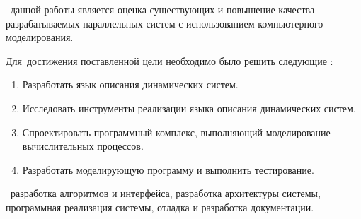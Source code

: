 
 \aim\ данной работы является оценка существующих и повышение качества разрабатываемых параллельных систем с использованием компьютерного моделирования.

Для~достижения поставленной цели необходимо было решить следующие {\tasks}:
\begin{enumerate}
  \item Разработать язык описания динамических систем.
  \item Исследовать инструменты реализации языка описания динамических систем.
  \item Спроектировать программный комплекс, выполняющий моделирование вычислительных процессов.
  \item Разработать моделирующую программу и выполнить тестирование.
\end{enumerate}









\contribution\ разработка алгоритмов и интерфейса, разработка архитектуры системы,
программная реализация системы, отладка и разработка документации.

